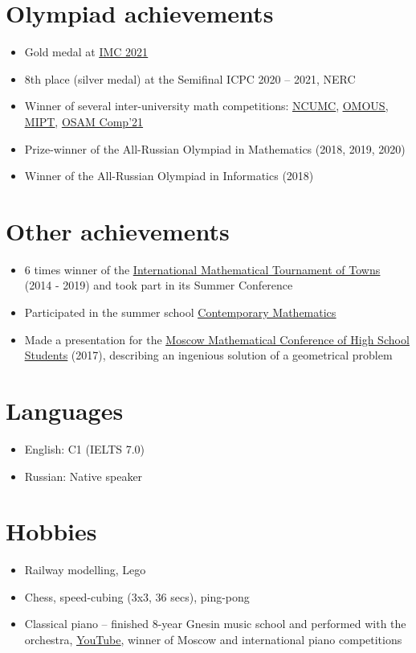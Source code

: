 \documentclass[letterpaper,11pt]{article}
\newcommand{\resumeItemListStart}{\begin{itemize}}
\newcommand{\resumeItemListEnd}{\end{itemize}\vspace{-8pt}}
\newcommand{\resumeItem}[1]{\item\small{{#1 \vspace{-2pt}}}}
\newcommand{\resumeSubItem}[1]{\resumeItem{#1}\vspace{-4pt}}
\begin{document}
\section{Olympiad achievements}
    \resumeItemListStart
        \resumeSubItem{Gold medal at \href{https://imc-math.org.uk/?year=2021}{\underline{IMC 2021}}}
        \resumeSubItem{8th place (silver medal) at the Semifinal ICPC 2020 – 2021, NERC}
        \resumeSubItem{Winner of several inter-university math competitions: \href{https://iuhd.edu.tm/competition/44}{\underline{NCUMC}}, \href{https://iuhd.edu.tm/competition/45}{\underline{OMOUS}}, \href{http://www.rkarasev.ru/note/66}{\underline{MIPT}}, \href{https://cs.hse.ru/en/announcements/504365867.html}{\underline{OSAM Comp'21}}}
        \resumeSubItem{Prize-winner of the All-Russian Olympiad in Mathematics (2018, 2019, 2020)}
        \resumeSubItem{Winner of the All-Russian Olympiad in Informatics (2018)}
    \resumeItemListEnd


\section{Other achievements}
    \resumeItemListStart
        \resumeSubItem{6 times winner of the \href{https://www.turgor.ru/en/}{\underline{International Mathematical Tournament of Towns}} (2014 - 2019) and took part in its Summer Conference}
        \resumeSubItem{Participated in the summer school \href{https://www.mccme.ru/dubna/eng/}{\underline{Contemporary Mathematics}}}
        \resumeSubItem{Made a presentation for the \href{https://mccme.ru/mmks/index_eng.htm}{\underline{Moscow Mathematical Conference of High School Students}} (2017), describing an ingenious solution of a geometrical problem}
    \resumeItemListEnd


\section{Languages}
    \resumeItemListStart
        \resumeSubItem{English: C1 (IELTS 7.0)}
        \resumeSubItem{Russian: Native speaker}
    \resumeItemListEnd


\section{Hobbies}
    \resumeItemListStart
        \resumeSubItem{Railway modelling, Lego}
        \resumeSubItem{Chess, speed-cubing (3x3, 36 secs), ping-pong}
        \resumeSubItem{Classical piano -- finished 8-year Gnesin music school and performed with the orchestra, \href{https://www.youtube.com/user/FeodorKuyanov/playlists}{\underline{YouTube}}, winner of Moscow and international piano competitions}
    \resumeItemListEnd
\end{document}
